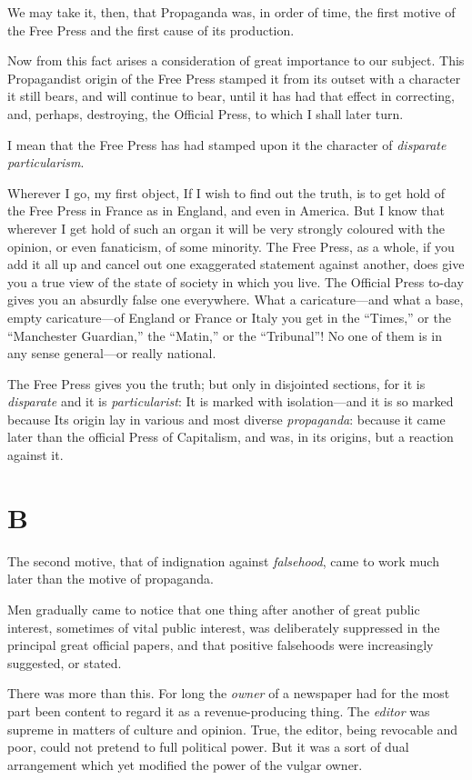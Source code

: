 \documentclass{book}
\begin{document}
We may take it, then, that Propaganda was, in order of time, the first motive of the Free Press and the first cause of its production.

Now from this fact arises a consideration of great importance to our subject. This Propagandist origin of the Free Press stamped it from its outset with a character it still bears, and will continue to bear, until it has had that effect in correcting, and, perhaps, destroying, the Official Press, to which I shall later turn.

I mean that the Free Press has had stamped upon it the character of \emph{disparate particularism}.

Wherever I go, my first object, If I wish to find out the truth, is to get hold of the Free Press in France as in England, and even in America. But I know that wherever I get hold of such an organ it will be very strongly coloured with the opinion, or even fanaticism, of some minority. The Free Press, as a whole, if you add it all up and cancel out one exaggerated statement against another, does give you a true view of the state of society in which you live. The Official Press to-day gives you an absurdly false one everywhere. What a caricature—and what a base, empty caricature—of England or France or Italy you get in the “Times,” or the “Manchester Guardian,” the “Matin,” or the “Tribunal”! No one of them is in any sense general—or really national.

The Free Press gives you the truth; but only in disjointed sections, for it is \emph{disparate} and it is \emph{particularist}: It is marked with isolation—and it is so marked because Its origin lay in various and most diverse \emph{propaganda}: because it came later than the official Press of Capitalism, and was, in its origins, but a reaction against it.

\section*{B}
The second motive, that of indignation against \emph{falsehood}, came to work much later than the motive of propaganda.

Men gradually came to notice that one thing after another of great public interest, sometimes of vital public interest, was deliberately suppressed in the principal great official papers, and that positive falsehoods were increasingly suggested, or stated.

There was more than this. For long the \emph{owner} of a newspaper had for the most part been content to regard it as a revenue-producing thing. The \emph{editor} was supreme in matters of culture and opinion. True, the editor, being revocable and poor, could not pretend to full political power. But it was a sort of dual arrangement which yet modified the power of the vulgar owner.
\end{document}
